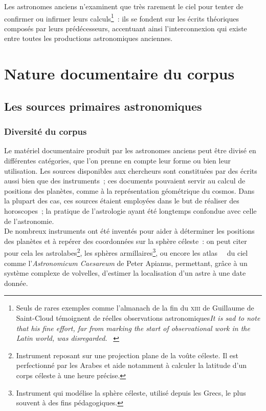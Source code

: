 \documentclass[a4paper,12pt,twoside]{book}
\newcommand{\eng}{\emph}
\newcommand{\XIII}{\textsc{xiii}\ieme{}\xspace}
\newcommand{\g}[1]{\og#1~\fg}
\begin{document}
Les astronomes anciens n'examinent que très rarement le ciel pour tenter de confirmer ou infirmer leurs calculs\footnote{Seuls de rares exemples comme l'almanach de la fin du \XIII de Guillaume de Saint-Cloud témoignent de réelles observations astronomiques\g{\eng{It is sad to note that his fine effort, far from marking the start of observational work in the Latin world, was disregarded.}} \cite[p.~22]{mercierStudiesTransmissionMedieval2004}}~: ils se fondent sur les écrits théoriques composés par leurs prédécesseurs, accentuant ainsi l'interconnexion qui existe entre toutes les productions astronomiques anciennes.

	\section{Nature documentaire du corpus}
		\subsection{Les sources primaires astronomiques}
			\subsubsection{Diversité du corpus}
Le matériel documentaire produit par les astronomes anciens peut être divisé en différentes catégories, que l'on prenne en compte leur forme ou bien leur utilisation. Les sources disponibles aux chercheurs sont constituées par des écrits aussi bien que des instruments~; ces documents pouvaient servir au calcul de positions des planètes, comme à la représentation géométrique du cosmos. Dans la plupart des cas, ces sources étaient employées dans le but de réaliser des horoscopes~; la pratique de l'astrologie ayant été longtemps confondue avec celle de l'astronomie.\\

De nombreux instruments ont été inventés pour aider à déterminer les positions des planètes et à repérer des coordonnées sur la sphère céleste~: on peut citer pour cela les astrolabes\footnote{Instrument reposant sur une projection plane de la voûte céleste. Il est perfectionné par les Arabes et aide notamment à calculer la latitude d'un corps céleste à une heure précise.}, les sphères armillaires\footnote{Instrument qui modélise la sphère céleste, utilisé depuis les Grecs, le plus souvent à des fins pédagogiques.}, ou encore les \g{atlas}~ du ciel comme l'\emph{Astronomicum Caesareum} de Peter Apianus, permettant, grâce à un système complexe de volvelles, d'estimer la localisation d'un astre à une date donnée.
\end{document}
